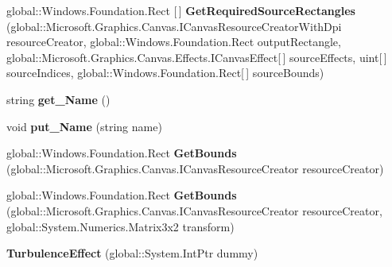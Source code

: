 \begin{DoxyCompactItemize}
global\+::\+Windows.\+Foundation.\+Rect \mbox{[}$\,$\mbox{]} {\bfseries Get\+Required\+Source\+Rectangles} (global\+::\+Microsoft.\+Graphics.\+Canvas.\+I\+Canvas\+Resource\+Creator\+With\+Dpi resource\+Creator, global\+::\+Windows.\+Foundation.\+Rect output\+Rectangle, global\+::\+Microsoft.\+Graphics.\+Canvas.\+Effects.\+I\+Canvas\+Effect\mbox{[}$\,$\mbox{]} source\+Effects, uint\mbox{[}$\,$\mbox{]} source\+Indices, global\+::\+Windows.\+Foundation.\+Rect\mbox{[}$\,$\mbox{]} source\+Bounds)
\item 
\mbox{\label{class_microsoft_1_1_graphics_1_1_canvas_1_1_effects_1_1_turbulence_effect_a225efebadd63ab69c2bea94cbb4b60a3}} 
string {\bfseries get\+\_\+\+Name} ()
\item 
\mbox{\label{class_microsoft_1_1_graphics_1_1_canvas_1_1_effects_1_1_turbulence_effect_aab356a0d7303f76e7c59e574c1b895f9}} 
void {\bfseries put\+\_\+\+Name} (string name)
\item 
\mbox{\label{class_microsoft_1_1_graphics_1_1_canvas_1_1_effects_1_1_turbulence_effect_a8a844736b9abd25959c5189938dc1e5f}} 
global\+::\+Windows.\+Foundation.\+Rect {\bfseries Get\+Bounds} (global\+::\+Microsoft.\+Graphics.\+Canvas.\+I\+Canvas\+Resource\+Creator resource\+Creator)
\item 
\mbox{\label{class_microsoft_1_1_graphics_1_1_canvas_1_1_effects_1_1_turbulence_effect_a3a6ab674e0ac6ee842030f2a1f7c0ad4}} 
global\+::\+Windows.\+Foundation.\+Rect {\bfseries Get\+Bounds} (global\+::\+Microsoft.\+Graphics.\+Canvas.\+I\+Canvas\+Resource\+Creator resource\+Creator, global\+::\+System.\+Numerics.\+Matrix3x2 transform)
\item 
\mbox{\label{class_microsoft_1_1_graphics_1_1_canvas_1_1_effects_1_1_turbulence_effect_a7138fc554faf8edbe9dd225b0d269fa1}} 
{\bfseries Turbulence\+Effect} (global\+::\+System.\+Int\+Ptr dummy)
\item 
\mbox{\label{class_microsoft_1_1_graphics_1_1_canvas_1_1_effects_1_1_turbulence_effect_a8b22105827e76c8c48ec956365234137}} 

\end{DoxyCompactItemize}
